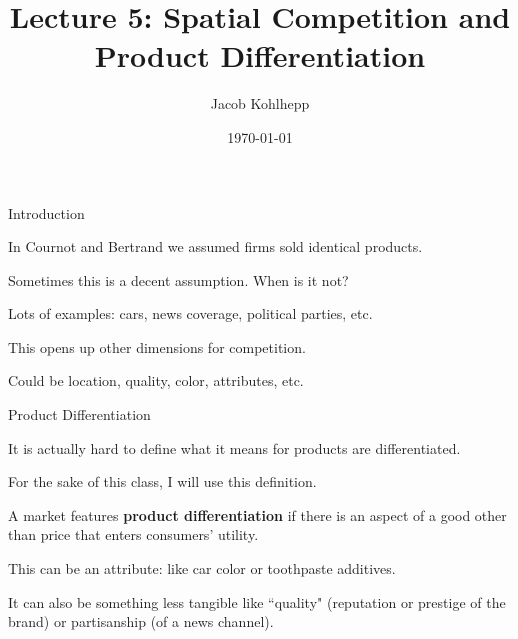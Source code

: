 \documentclass[aspectratio=169]{beamer}
\title[Spatial]{Lecture 5: Spatial Competition and Product Differentiation} %
\author{Jacob Kohlhepp} %
\institute[UCLA] %
{
Econ 101 \\ %
\medskip
}
\date{\today} %
\newenvironment{wideitemize}{\itemize\addtolength{\itemsep}{10pt}}{\enditemize}
\begin{document}
\begin{frame}
\titlepage %
\end{frame}

\begin{frame}{Introduction}
\begin{wideitemize}
    \item In Cournot and Bertrand we assumed firms sold identical products. 
    \item Sometimes this is a decent assumption. When is it not?\pause
    \item Lots of examples: cars, news coverage, political parties, etc.
    \item This opens up other dimensions for competition.
    \item Could be location, quality, color, attributes, etc.
\end{wideitemize}

\end{frame}

\begin{frame}{Product Differentiation}

\begin{wideitemize}
    \item It is actually hard to define what it means for products are differentiated.
    \item For the sake of this class, I will use this definition.
    \begin{definition}
    A market features \textbf{product differentiation} if there is an aspect of a good other than price that enters consumers' utility.
    \end{definition}
    \item This can be an attribute: like car color or toothpaste additives.
    \item It can also be something less tangible like ``quality" (reputation or prestige of the brand) or partisanship (of a news channel).
\end{wideitemize}

    
\end{frame}
\end{document}
